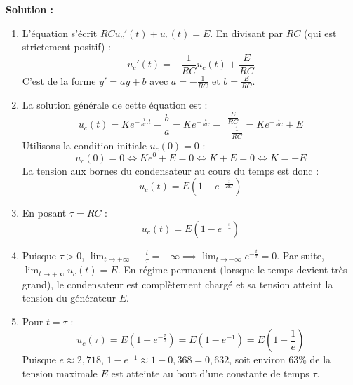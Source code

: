 \textbf{Solution :}
\begin{enumerate}
    \item L'équation s'écrit $R C u_c'(t) + u_c(t) = E$. En divisant par $RC$ (qui est strictement positif) :
    \[
    u_c'(t) = -\frac{1}{R C} u_c(t) + \frac{E}{R C}
    \]
    C'est de la forme $y' = ay+b$ avec $a = -\frac{1}{R C}$ et $b = \frac{E}{R C}$.
    
    \item La solution générale de cette équation est :
    \[
    u_c(t) = K e^{-\frac{1}{R C} t} - \frac{b}{a} = K e^{-\frac{t}{R C}} - \frac{\frac{E}{R C}}{-\frac{1}{R C}} = K e^{-\frac{t}{R C}} + E
    \]
    Utilisons la condition initiale $u_c(0) = 0$ :
    \[
    u_c(0) = 0 \iff K e^{0} + E = 0 \iff K + E = 0 \iff K = -E
    \]
    La tension aux bornes du condensateur au cours du temps est donc :
    \[
    u_c(t) = E \left( 1 - e^{-\frac{t}{R C}} \right)
    \]
    
    \item En posant $\tau = R C$ :
    \[
    u_c(t) = E \left( 1 - e^{-\frac{t}{\tau}} \right)
    \]
    
    \item Puisque $\tau > 0$, $\lim_{t \to +\infty} -\frac{t}{\tau} = -\infty \implies \lim_{t \to +\infty} e^{-\frac{t}{\tau}} = 0$.
    Par suite, $\lim_{t \to +\infty} u_c(t) = E$.
    En régime permanent (lorsque le temps devient très grand), le condensateur est complètement chargé et sa tension atteint la tension du générateur $E$.
    
    \item Pour $t = \tau$ :
    \[
    u_c(\tau) = E \left( 1 - e^{-\frac{\tau}{\tau}} \right) = E(1 - e^{-1}) = E\left(1 - \frac{1}{e}\right)
    \]
    Puisque $e \approx 2,718$, $1 - e^{-1} \approx 1 - 0,368 = 0,632$, soit environ $63\%$ de la tension maximale $E$ est atteinte au bout d'une constante de temps $\tau$.
\end{enumerate}

